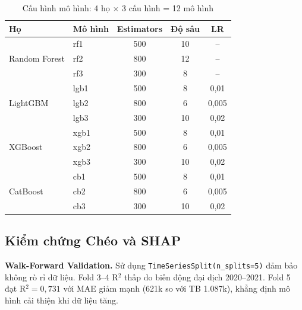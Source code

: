 \documentclass{article}
\begin{document}
\begin{table}[h]
  \caption{Cấu hình mô hình: 4 họ $\times$ 3 cấu hình = 12 mô hình}
  \label{tab:models}
  \centering
  \begin{tabular}{llccc}
    \toprule
    Họ & Mô hình & Estimators & Độ sâu & LR \\
    \midrule
    \multirow{3}{*}{Random Forest} & rf1 & 500 & 10 & -- \\
     & rf2 & 800 & 12 & -- \\
     & rf3 & 300 & 8 & -- \\
    \midrule
    \multirow{3}{*}{LightGBM} & lgb1 & 500 & 8 & 0,01 \\
     & lgb2 & 800 & 6 & 0,005 \\
     & lgb3 & 300 & 10 & 0,02 \\
    \midrule
    \multirow{3}{*}{XGBoost} & xgb1 & 500 & 8 & 0,01 \\
     & xgb2 & 800 & 6 & 0,005 \\
     & xgb3 & 300 & 10 & 0,02 \\
    \midrule
    \multirow{3}{*}{CatBoost} & cb1 & 500 & 8 & 0,01 \\
     & cb2 & 800 & 6 & 0,005 \\
     & cb3 & 300 & 10 & 0,02 \\
    \bottomrule
  \end{tabular}
\end{table}

\subsection{Kiểm chứng Chéo và SHAP}

\textbf{Walk-Forward Validation.} Sử dụng \texttt{TimeSeriesSplit(n\_splits=5)} đảm bảo không rò rỉ dữ liệu. Fold 3--4 R$^2$ thấp do biến động đại dịch 2020--2021. Fold 5 đạt R$^2 = 0{,}731$ với MAE giảm mạnh (621k so với TB 1.087k), khẳng định mô hình cải thiện khi dữ liệu tăng.

\end{document}
